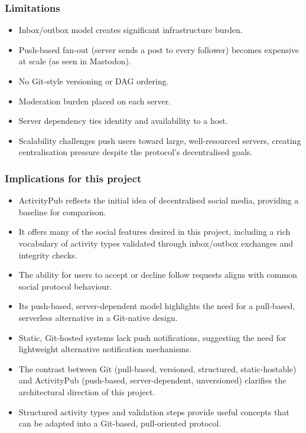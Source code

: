 \subsubsection{Limitations}
\begin{itemize}
    \item Inbox/outbox model creates significant infrastructure burden.
    \item Push-based fan-out (server sends a post to every follower) becomes expensive at scale (as seen in Mastodon).
    \item No Git-style versioning or DAG ordering.
    \item Moderation burden placed on each server.
    \item Server dependency ties identity and availability to a host.
    \item Scalability challenges push users toward large, well-resourced servers, creating centralisation pressure despite the protocol’s decentralised goals.
\end{itemize}

\subsubsection{Implications for this project}
\begin{itemize}
    \item ActivityPub reflects the initial idea of decentralised social media, providing a baseline for comparison.
    \item It offers many of the social features desired in this project, including a rich vocabulary of activity types validated through inbox/outbox exchanges and integrity checks.
    \item The ability for users to accept or decline follow requests aligns with common social protocol behaviour.
    \item Its push-based, server-dependent model highlights the need for a pull-based, serverless alternative in a Git-native design.
    \item Static, Git-hosted systems lack push notifications, suggesting the need for lightweight alternative notification mechanisms.
    \item The contrast between Git (pull-based, versioned, structured, static-hostable) and ActivityPub (push-based, server-dependent, unversioned) clarifies the architectural direction of this project.
    \item Structured activity types and validation steps provide useful concepts that can be adapted into a Git-based, pull-oriented protocol.
\end{itemize}

